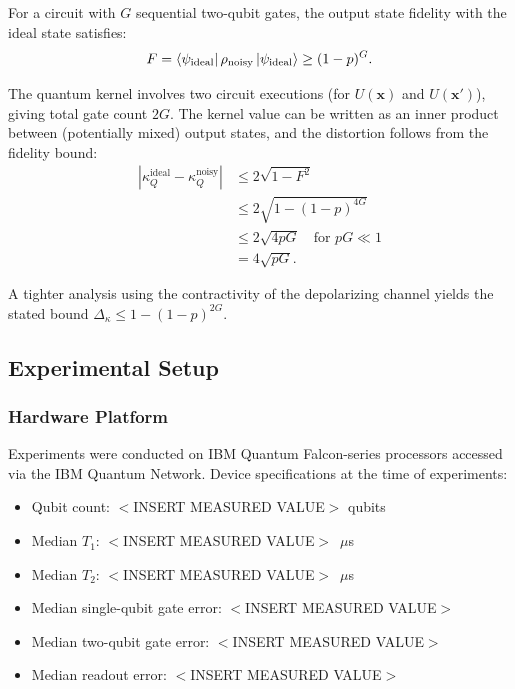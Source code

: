 \documentclass[aps,prb,reprint,superscriptaddress,showpacs]{revtex4-2}
\begin{document}
For a circuit with $G$ sequential two-qubit gates, the output state fidelity with the ideal state satisfies:
\begin{equation}
    F = \bra{\psi_{\text{ideal}}} \rho_{\text{noisy}} \ket{\psi_{\text{ideal}}} \geq (1-p)^G.
\end{equation}

The quantum kernel involves two circuit executions (for $U(\mathbf{x})$ and $U(\mathbf{x}')$), giving total gate count $2G$. The kernel value can be written as an inner product between (potentially mixed) output states, and the distortion follows from the fidelity bound:
\begin{align}
    |\kappa_Q^{\text{ideal}} - \kappa_Q^{\text{noisy}}| &\leq 2\sqrt{1 - F^2} \\
    &\leq 2\sqrt{1 - (1-p)^{4G}} \\
    &\leq 2\sqrt{4pG} \quad \text{for } pG \ll 1 \\
    &= 4\sqrt{pG}.
\end{align}

A tighter analysis using the contractivity of the depolarizing channel yields the stated bound $\Delta_\kappa \leq 1 - (1-p)^{2G}$.


\subsection{Experimental Setup}

\subsubsection{Hardware Platform}

Experiments were conducted on IBM Quantum Falcon-series processors accessed via the IBM Quantum Network. Device specifications at the time of experiments:
\begin{itemize}
    \item Qubit count: $<$INSERT MEASURED VALUE$>$ qubits
    \item Median $T_1$: $<$INSERT MEASURED VALUE$>$~$\mu$s
    \item Median $T_2$: $<$INSERT MEASURED VALUE$>$~$\mu$s  
    \item Median single-qubit gate error: $<$INSERT MEASURED VALUE$>$
    \item Median two-qubit gate error: $<$INSERT MEASURED VALUE$>$
    \item Median readout error: $<$INSERT MEASURED VALUE$>$
\end{itemize}
\end{document}
